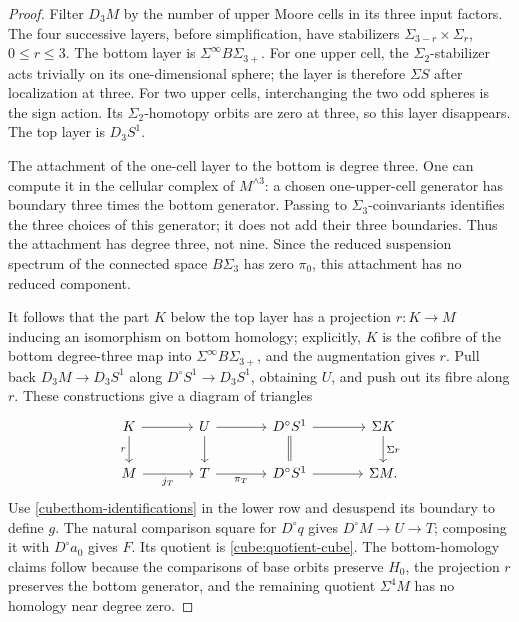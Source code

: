 \begin{proof}
Filter \(D_3M\) by the number of upper Moore cells in its
three input factors.  The four successive layers, before
simplification, have stabilizers
\(\Sigma_{3-r}\times\Sigma_r\), \(0\leq r\leq3\).
The bottom layer is \(\Sigma^\infty B\Sigma_{3+}\).
For one upper cell, the \(\Sigma_2\)-stabilizer acts trivially
on its one-dimensional sphere; the layer is therefore
\(\Sigma S\) after localization at three.  For two upper
cells, interchanging the two odd spheres is the sign action.
Its \(\Sigma_2\)-homotopy orbits are zero at three, so this
layer disappears.  The top layer is \(D_3S^1\).

The attachment of the one-cell layer to the bottom is degree
three.  One can compute it in the cellular complex of
\(M^{\wedge3}\): a chosen one-upper-cell generator has
boundary three times the bottom generator.
Passing to \(\Sigma_3\)-coinvariants identifies the three
choices of this generator; it does not add their three
boundaries.  Thus the attachment has degree three, not nine.
Since the reduced suspension spectrum of the connected
space \(B\Sigma_3\) has zero \(\pi_0\), this attachment has
no reduced component.

It follows that the part \(K\) below the top layer has a
projection \(r:K\to M\) inducing an isomorphism on bottom
homology; explicitly, \(K\) is the cofibre of the bottom
degree-three map into \(\Sigma^\infty B\Sigma_{3+}\), and
the augmentation gives \(r\).
Pull back \(D_3M\to D_3S^1\) along
\(D^\circ S^1\to D_3S^1\), obtaining \(U\), and push out
its fibre along \(r\).  These constructions give a diagram
of triangles
\[
\begin{tikzcd}[column sep=large]
 K \arrow[r] \arrow[d,"r"'] &
 U \arrow[r] \arrow[d] &
 D^\circ S^1 \arrow[d,equal] \arrow[r] &
 \Sigma K \arrow[d,"\Sigma r"]\\
 M \arrow[r,"j_T"'] &
 T \arrow[r,"\pi_T"'] &
 D^\circ S^1 \arrow[r] &
 \Sigma M .
\end{tikzcd}
\]
Use \eqref{cube:thom-identifications} in the lower row
and desuspend its boundary to define \(g\).
The natural comparison square for \(D^\circ q\) gives
\(D^\circ M\to U\to T\); composing it with
\(D^\circ a_0\) gives \(F\).
Its quotient is \eqref{cube:quotient-cube}.
The bottom-homology claims follow because the comparisons
of base orbits preserve \(H_0\), the projection \(r\)
preserves the bottom generator, and the remaining quotient
\(\Sigma^4M\) has no homology near degree zero.
\end{proof}

